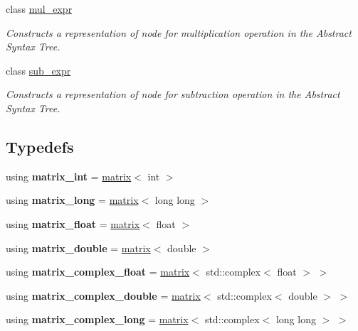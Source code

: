 \begin{DoxyCompactItemize}
class \mbox{\hyperlink{classtest_1_1mul__expr}{mul\+\_\+expr}}
\begin{DoxyCompactList}\small\item\em Constructs a representation of node for multiplication operation in the Abstract Syntax Tree. \end{DoxyCompactList}\item 
class \mbox{\hyperlink{classtest_1_1sub__expr}{sub\+\_\+expr}}
\begin{DoxyCompactList}\small\item\em Constructs a representation of node for subtraction operation in the Abstract Syntax Tree. \end{DoxyCompactList}\end{DoxyCompactItemize}
\subsection*{Typedefs}
\begin{DoxyCompactItemize}
\item 
\mbox{\label{namespacetest_a69806fc8b5b61fc4657f12f28ab961c0}} 
using {\bfseries matrix\+\_\+int} = \mbox{\hyperlink{classtest_1_1matrix}{matrix}}$<$ int $>$
\item 
\mbox{\label{namespacetest_ae0d41fab07012aa4aeb82b7b64900ed5}} 
using {\bfseries matrix\+\_\+long} = \mbox{\hyperlink{classtest_1_1matrix}{matrix}}$<$ long long $>$
\item 
\mbox{\label{namespacetest_ab9bf1cdf5f02172d62045d12c97feda7}} 
using {\bfseries matrix\+\_\+float} = \mbox{\hyperlink{classtest_1_1matrix}{matrix}}$<$ float $>$
\item 
\mbox{\label{namespacetest_ad965d4aedb3467b9200b740eabd0285f}} 
using {\bfseries matrix\+\_\+double} = \mbox{\hyperlink{classtest_1_1matrix}{matrix}}$<$ double $>$
\item 
\mbox{\label{namespacetest_a0d0695689353608a7e3dc3a28a79600c}} 
using {\bfseries matrix\+\_\+complex\+\_\+float} = \mbox{\hyperlink{classtest_1_1matrix}{matrix}}$<$ std\+::complex$<$ float $>$ $>$
\item 
\mbox{\label{namespacetest_adb1c1a799a26028b63e44d7a3b9e7a9c}} 
using {\bfseries matrix\+\_\+complex\+\_\+double} = \mbox{\hyperlink{classtest_1_1matrix}{matrix}}$<$ std\+::complex$<$ double $>$ $>$
\item 
\mbox{\label{namespacetest_adfaf60b1607a89f0f5c159a6988461be}} 
using {\bfseries matrix\+\_\+complex\+\_\+long} = \mbox{\hyperlink{classtest_1_1matrix}{matrix}}$<$ std\+::complex$<$ long long $>$ $>$
\end{DoxyCompactItemize}
